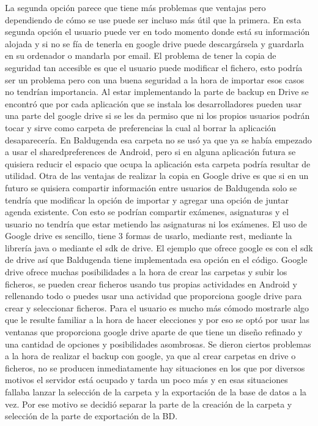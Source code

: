 La segunda opción parece que tiene más problemas que ventajas pero dependiendo de cómo se use puede ser incluso más útil que la primera. 
En esta segunda opción el usuario puede ver en todo momento donde está su información alojada y si no se fía de tenerla en google drive puede descargársela y guardarla en su ordenador o mandarla por email.
El problema de tener la copia de seguridad tan accesible es que el usuario puede modificar el fichero, esto podría ser un problema pero con una buena seguridad a la hora de importar esos casos no tendrían importancia.
Al estar implementando la parte de backup en Drive se encontró que por cada aplicación que se instala los desarrolladores pueden usar una parte del google drive si se les da permiso que ni los propios usuarios podrán tocar y sirve como carpeta de preferencias la cual al borrar la aplicación desaparecería.
En Baldugenda esa carpeta no se usó ya que ya se había empezado a usar el sharedpreferences de Android, pero si en alguna aplicación futura se quisiera reducir el espacio que ocupa la aplicación esta carpeta podría resultar de utilidad.
Otra de las ventajas de realizar la copia en Google drive es que si en un futuro se quisiera compartir información entre usuarios de Baldugenda solo se tendría que modificar la opción de importar y agregar una opción de juntar agenda existente. Con esto se podrían compartir exámenes, asignaturas y el usuario no tendría que estar metiendo las asignaturas ni los exámenes.
El uso de Google drive es sencillo, tiene 3 formas de usarlo, mediante rest, mediante la librería java o mediante el sdk de drive.
El ejemplo que ofrece google es con el sdk de drive así que Baldugenda tiene implementada esa opción en el código.
Google drive ofrece muchas posibilidades a la hora de crear las carpetas y subir los ficheros, se pueden crear ficheros usando tus propias actividades en Android y rellenando todo o puedes usar una actividad que proporciona google drive para crear y seleccionar ficheros.
Para el usuario es mucho más cómodo mostrarle algo que le resulte familiar a la hora de hacer elecciones y por eso se optó por usar las ventanas que proporciona google drive aparte de que tiene un diseño refinado y una cantidad de opciones y posibilidades asombrosas.
Se dieron ciertos problemas a la hora de realizar el backup con google, ya que al crear carpetas en drive o ficheros, no se producen inmediatamente hay situaciones en los que por diversos motivos el servidor está ocupado y tarda un poco más y en esas situaciones fallaba lanzar la selección de la carpeta y la exportación de la base de datos a la vez.
Por ese motivo se decidió separar la parte de la creación de la carpeta y selección de la parte de exportación de la BD.


